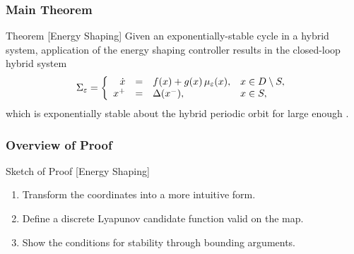 \begin{frame}[t]
  \frametitle{Main Theorem}
  \begin{block}{Theorem [Energy Shaping]}
    Given an exponentially-stable cycle in a hybrid system, application
    of the energy shaping controller results in the closed-loop hybrid system
    \begin{align*}
      \Sigma_{\varepsilon} = \left\{
        \begin{array}{r c l l}
          \dot{x} &=& f(x) + g(x) \, \mu_{\varepsilon}(x), & x \in D \setminus S,\\
          x^{+} &=& \Delta(x^{-}), & x \in S,
        \end{array}\right.
    \end{align*}
    which is exponentially stable about the hybrid periodic orbit \orbit for
    large enough \resclfparam.
  \end{block}
\end{frame}

\begin{frame}[t]
  \frametitle{Overview of Proof}
  \begin{block}{Sketch of Proof [Energy Shaping]}
    \begin{enumerate}
    \item Transform the coordinates into a more intuitive form.
    \item Define a discrete Lyapunov candidate function valid on the \Poincare map.
    \item Show the conditions for stability through bounding arguments.
    \end{enumerate}
  \end{block}
\end{frame}

